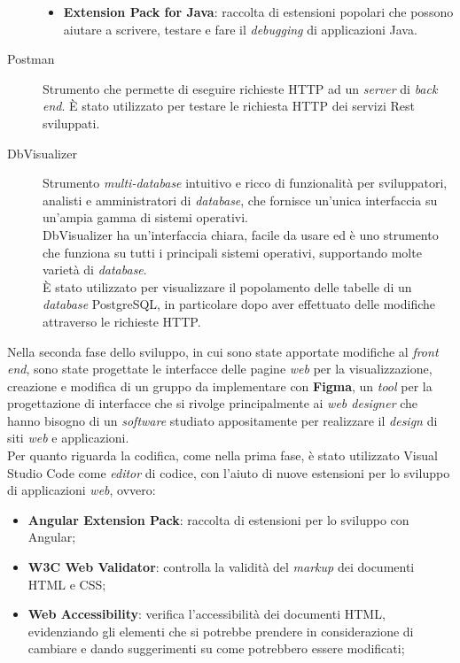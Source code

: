 \begin{description}
\begin{itemize}
                  \item \textbf{Extension Pack for Java}: raccolta di
                        estensioni popolari
                        che possono aiutare a scrivere, testare e fare il
                        \textit{debugging} di applicazioni Java.
            \end{itemize}
      \item[Postman]
            Strumento che permette di eseguire richieste HTTP ad un
            \textit{server} di \textit{back end}. È stato utilizzato per
            testare le richiesta HTTP dei servizi Rest sviluppati.
      \item[DbVisualizer] Strumento \textit{multi-database} intuitivo e ricco
            di
            funzionalità per sviluppatori, analisti e amministratori di
            \textit{database},
            che fornisce un'unica interfaccia su un'ampia gamma di
            sistemi
            operativi. \\
            DbVisualizer ha un'interfaccia chiara, facile da usare ed è uno
            strumento
            che
            funziona su tutti i principali sistemi operativi, supportando molte
            varietà di
            \textit{database}. \\
            È stato utilizzato per visualizzare il popolamento delle tabelle
            di un \textit{database} PostgreSQL, in particolare dopo aver
            effettuato delle modifiche attraverso le richieste HTTP.
\end{description}

\noindent Nella seconda fase dello sviluppo, in cui sono state apportate
modifiche al
\textit{front end}, sono state progettate le interfacce delle pagine
\textit{web} per la visualizzazione, creazione e modifica di un gruppo da
implementare con \textbf{Figma}, un \textit{tool} per la progettazione di
interfacce che si rivolge principalmente ai \textit{web designer} che hanno
bisogno di un
\textit{software} studiato appositamente per realizzare il \textit{design} di
siti \textit{web} e applicazioni.\\

\noindent Per quanto riguarda la codifica, come nella prima fase, è stato
utilizzato Visual Studio
Code come \textit{editor} di codice, con l'aiuto di nuove estensioni per lo
sviluppo di applicazioni \textit{web}, ovvero:
\begin{itemize}
      \item \textbf{Angular Extension Pack}: raccolta di
            estensioni per lo sviluppo con Angular;
      \item \textbf{W3C Web Validator}: controlla la validità del
            \textit{markup} dei documenti HTML e CSS;
      \item \textbf{Web Accessibility}: verifica l'accessibilità
            dei documenti HTML, evidenziando gli elementi che si
            potrebbe prendere in considerazione di cambiare e dando
            suggerimenti su come potrebbero essere modificati;
\end{itemize}

